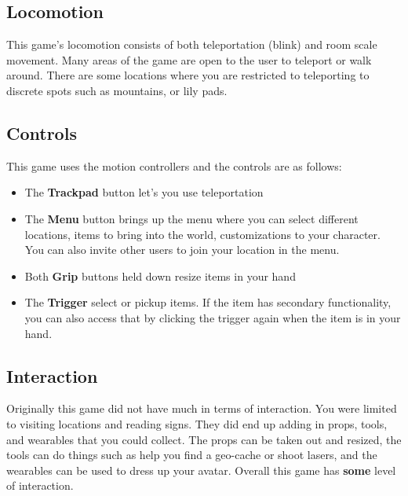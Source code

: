 \documentclass[journal]{IEEEtran}
\begin{document}
\begin{figure}[h]
	\centering
\end{figure}

\subsection{Locomotion}
This game's locomotion consists of both teleportation (blink) and room scale movement. Many areas of the game are open to the user to teleport or walk around. There are some locations where you are restricted to teleporting to discrete spots such as mountains, or lily pads. 
 
\subsection{Controls}
This game uses the motion controllers and the controls are as follows: 

\begin{itemize}
		\item The \textbf{Trackpad} button let's you use teleportation
		\item The \textbf{Menu} button brings up the menu where you can select different locations, items to bring into the world, customizations to your character. You can also invite other users to join your location in the menu.  
		\item Both \textbf{Grip} buttons held down resize items in your hand
		\item The \textbf{Trigger} select or pickup items. If the item has secondary functionality, you can also access that by clicking the trigger again when the item is in your hand.  


\end{itemize}
\subsection{Interaction}
Originally this game did not have much in terms of interaction. You were limited to visiting locations and reading signs. They did end up adding in props, tools, and wearables that you could collect. The props can be taken out and resized, the tools can do things such as help you find a geo-cache or shoot lasers, and the wearables can be used to dress up your avatar. Overall this game has \textbf{some} level of interaction.
\end{document}
